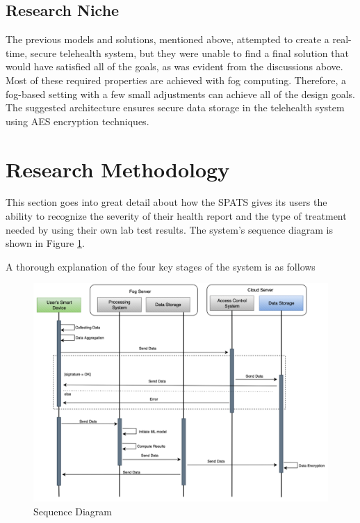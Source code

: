 \documentclass[10pt]{article}
\begin{document}
\subsection{Research Niche}
The previous models and solutions, mentioned above, attempted to create a real-time, secure telehealth system, but they were unable to find a final solution that would have satisfied all of the goals, as was evident from the discussions above. Most of these required properties are achieved with fog computing. Therefore, a fog-based setting with a few small adjustments can achieve all of the design goals. The suggested architecture ensures secure data storage in the telehealth system using AES encryption techniques.
\newline
\newline

\section{Research Methodology} 
This section goes into great detail about how the SPATS gives its users the ability to recognize the severity of their health report and the type of treatment needed by using their own lab test results. The system's sequence diagram is shown in Figure \ref{fig:3}.

A thorough explanation of the four key stages of the system is as follows

\begin{figure}[H]
    \begin{center}
        \includegraphics[width=0.9\linewidth,frame]{CA2-template/RIC3.png}
        \caption{Sequence Diagram\label{fig:3}}
    \end{center}
\end{figure}
\end{document}
